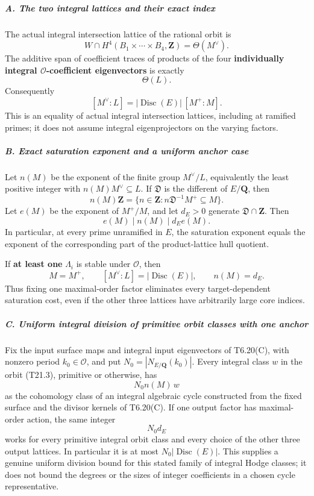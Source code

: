 \documentclass[11pt,a4paper]{article}
\theoremstyle{definition}
\begin{document}
\subparagraph{A. The two integral lattices and their exact index}\label{a.-the-two-integral-lattices-and-their-exact-index}

The actual integral intersection lattice of the rational orbit is \[
 W\cap H^4(B_1\times\cdots\times B_4,\mathbf Z)
     =\Theta(M^\vee).
 \tag{T21.3}
\] The additive span of coefficient traces of products of the four \textbf{individually integral \(\mathcal O\)-coefficient eigenvectors} is exactly \[
 \Theta(L).
 \tag{T21.4}
\] Consequently \[
 [M^\vee:L]
   =|\operatorname{Disc}(E)|\,[M^+:M].
 \tag{T21.5}
\] This is an equality of actual integral intersection lattices, including at ramified primes; it does not assume integral eigenprojectors on the varying factors.

\subparagraph{B. Exact saturation exponent and a uniform anchor case}\label{b.-exact-saturation-exponent-and-a-uniform-anchor-case}

Let \(n(M)\) be the exponent of the finite group \(M^\vee/L\), equivalently the least positive integer with \(n(M)M^\vee\subseteq L\). If \(\mathfrak D\) is the different of \(E/\mathbf Q\), then \[
 n(M)\mathbf Z
 =\{n\in\mathbf Z:n\mathfrak D^{-1}M^+\subseteq M\}.
 \tag{T21.6}
\] Let \(e(M)\) be the exponent of \(M^+/M\), and let \(d_E>0\) generate \(\mathfrak D\cap\mathbf Z\). Then \[
 e(M)\mid n(M)\mid d_E e(M).
 \tag{T21.7}
\] In particular, at every prime unramified in \(E\), the saturation exponent equals the exponent of the corresponding part of the product-lattice hull quotient.

If \textbf{at least one} \(\Lambda_i\) is stable under \(\mathcal O\), then \[
 M=M^+,
 \qquad [M^\vee:L]=|\operatorname{Disc}(E)|,
 \qquad n(M)=d_E.
 \tag{T21.8}
\] Thus fixing one maximal-order factor eliminates every target-dependent saturation cost, even if the other three lattices have arbitrarily large core indices.

\subparagraph{C. Uniform integral division of primitive orbit classes with one anchor}\label{c.-uniform-integral-division-of-primitive-orbit-classes-with-one-anchor}

Fix the input surface maps and integral input eigenvectors of T6.20(C), with nonzero period \(k_0\in\mathcal O\), and put \(N_0=|N_{E/\mathbf Q}(k_0)|\). Every integral class \(w\) in the orbit (T21.3), primitive or otherwise, has \[
 N_0 n(M)\,w
\] as the cohomology class of an integral algebraic cycle constructed from the fixed surface and the divisor kernels of T6.20(C). If one output factor has maximal-order action, the same integer \[
 N_0d_E
 \tag{T21.9}
\] works for every primitive integral orbit class and every choice of the other three output lattices. In particular it is at most \(N_0|\operatorname{Disc}(E)|\). This supplies a genuine uniform division bound for this stated family of integral Hodge classes; it does not bound the degrees or the sizes of integer coefficients in a chosen cycle representative.
\end{document}

